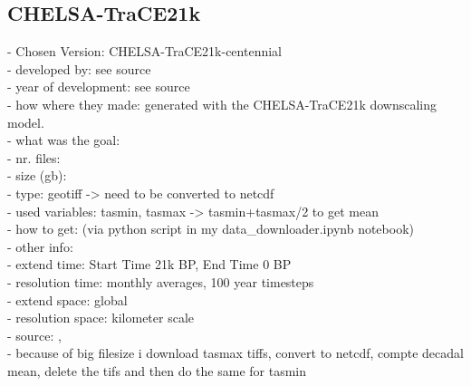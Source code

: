 \documentclass[12pt]{scrartcl}
\begin{document}
\subsection{CHELSA-TraCE21k}
- Chosen Version: CHELSA-TraCE21k-centennial\\
- developed by: see source\\
- year of development: see source \\
- how where they made: generated with the CHELSA-TraCE21k downscaling model. \\
- what was the goal: \\
- nr. files: \\
- size (gb): \\
- type: geotiff -> need to be converted to netcdf\\
- used variables: tasmin, tasmax -> tasmin+tasmax/2 to get mean\\
- how to get: (via python script in my data\_downloader.ipynb notebook)\\
- other info: \\
- extend time: Start Time 21k BP, End Time 0 BP\\
- resolution time: monthly averages, 100 year timesteps\\
- extend space: global \\
- resolution space: kilometer scale\\
- source: \cite{chelsa_trace21k_paper}, \cite{chelsa_trace21k_data} \\
- because of big filesize i download tasmax tiffs, convert to netcdf, compte decadal mean, delete the tifs and then do the same for tasmin
\end{document}
